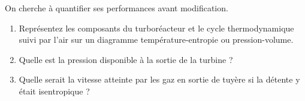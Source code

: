 	On cherche à quantifier ses performances avant modification.
		\begin{enumerate}
			\item Représentez les composants du turboréacteur et le cycle thermodynamique suivi par l’air sur un diagramme température-entropie ou pression-volume.
			\item Quelle est la pression disponible à la sortie de la turbine ?
			\item Quelle serait la vitesse atteinte par les gaz en sortie de tuyère si la détente y était isentropique ?
		\end{enumerate}

	\onlyamphibook{\begin{figure}}
	\onlyframabook{\begin{figure}[htc]}%
		\begin{center}
		\end{center}
